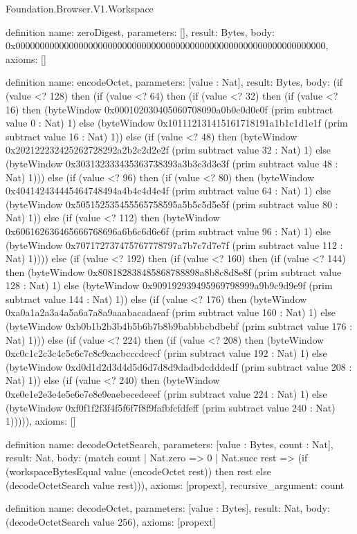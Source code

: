 \begin{lexlean}{Foundation.Browser.V1.Workspace}
\begin{semanticmodule}
definition{
  name: zeroDigest,
  parameters: [],
  result: Bytes,
  body: 0x0000000000000000000000000000000000000000000000000000000000000000,
  axioms: []
}

definition{
  name: encodeOctet,
  parameters: [value : Nat],
  result: Bytes,
  body: (if (value <? 128) then (if (value <? 64) then (if (value <? 32) then (if (value <? 16) then (byteWindow 0x000102030405060708090a0b0c0d0e0f (prim subtract value 0 : Nat) 1) else (byteWindow 0x101112131415161718191a1b1c1d1e1f (prim subtract value 16 : Nat) 1)) else (if (value <? 48) then (byteWindow 0x202122232425262728292a2b2c2d2e2f (prim subtract value 32 : Nat) 1) else (byteWindow 0x303132333435363738393a3b3c3d3e3f (prim subtract value 48 : Nat) 1))) else (if (value <? 96) then (if (value <? 80) then (byteWindow 0x404142434445464748494a4b4c4d4e4f (prim subtract value 64 : Nat) 1) else (byteWindow 0x505152535455565758595a5b5c5d5e5f (prim subtract value 80 : Nat) 1)) else (if (value <? 112) then (byteWindow 0x606162636465666768696a6b6c6d6e6f (prim subtract value 96 : Nat) 1) else (byteWindow 0x707172737475767778797a7b7c7d7e7f (prim subtract value 112 : Nat) 1)))) else (if (value <? 192) then (if (value <? 160) then (if (value <? 144) then (byteWindow 0x808182838485868788898a8b8c8d8e8f (prim subtract value 128 : Nat) 1) else (byteWindow 0x909192939495969798999a9b9c9d9e9f (prim subtract value 144 : Nat) 1)) else (if (value <? 176) then (byteWindow 0xa0a1a2a3a4a5a6a7a8a9aaabacadaeaf (prim subtract value 160 : Nat) 1) else (byteWindow 0xb0b1b2b3b4b5b6b7b8b9babbbcbdbebf (prim subtract value 176 : Nat) 1))) else (if (value <? 224) then (if (value <? 208) then (byteWindow 0xc0c1c2c3c4c5c6c7c8c9cacbcccdcecf (prim subtract value 192 : Nat) 1) else (byteWindow 0xd0d1d2d3d4d5d6d7d8d9dadbdcdddedf (prim subtract value 208 : Nat) 1)) else (if (value <? 240) then (byteWindow 0xe0e1e2e3e4e5e6e7e8e9eaebecedeeef (prim subtract value 224 : Nat) 1) else (byteWindow 0xf0f1f2f3f4f5f6f7f8f9fafbfcfdfeff (prim subtract value 240 : Nat) 1))))),
  axioms: []
}

definition{
  name: decodeOctetSearch,
  parameters: [value : Bytes, count : Nat],
  result: Nat,
  body: (match count
    | Nat.zero => 0
    | Nat.succ rest => (if (workspaceBytesEqual value (encodeOctet rest)) then rest else (decodeOctetSearch value rest))),
  axioms: [propext],
  recursive_argument: count
}

definition{
  name: decodeOctet,
  parameters: [value : Bytes],
  result: Nat,
  body: (decodeOctetSearch value 256),
  axioms: [propext]
}


\end{semanticmodule}
\end{lexlean}
